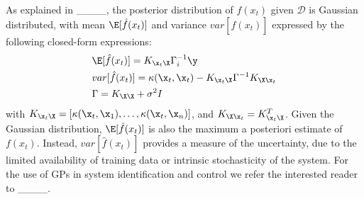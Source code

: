 As explained in ____, the posterior distribution of $f(x_t)$ given $\mathcal{D}$ is Gaussian distributed, with mean $\E[\hat{f}(x_t)]$ and variance $var[\hat{f}(x_t)]$ expressed by the following closed-form expressions:
\begin{subequations}
    \begin{align}
        &\E[\hat{f}(x_t)] = K_{{\x}_t {\X}} \Gamma_i^{-1} \y    \label{eq:gp_regression_formulas-mean}\\
        &var[\hat{f}(x_t)] = \kappa ({\x}_t, {\x}_t) - K_{{\x}_t {\X}} \Gamma^{-1} K_{{\X} {\x}_t}\label{eq:gp_regression_formulas-var} \\
        &\Gamma = K_{{\X} {\X}} + \sigma^2 I \nonumber
    \end{align}
    \label{eq:gp_regression_formulas}
\end{subequations}
with $ K_{{\x}_t {\X}} = [\kappa(\x_t, \x_1), \dots, \kappa(\x_t, \x_n)]$, and $ K_{{\X} {\x}_t} = K_{{\x}_t {\X}}^T$.
Given the Gaussian distribution, $\E[\hat{f}(x_t)]$ is also the maximum a posteriori estimate of $f(x_t)$. Instead, $var[\hat{f}(x_t)]$ provides a measure of the uncertainty, due to the limited availability of training data or intrinsic stochasticity of the system. 
For the use of GPs in system identification and control we refer the interested reader to
____.